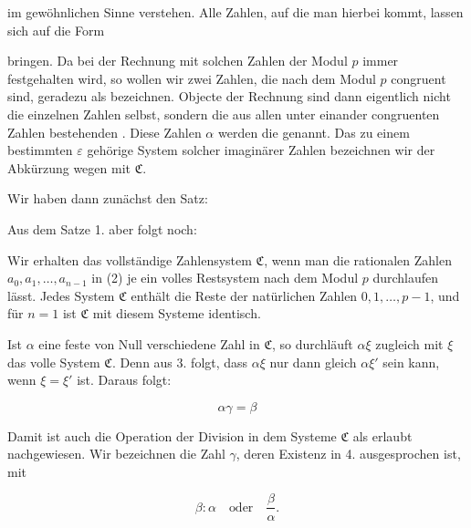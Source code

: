 im gewöhnlichen Sinne verstehen. Alle Zahlen, auf die man hierbei kommt, lassen sich auf die Form


bringen. Da bei der Rechnung mit solchen Zahlen der Modul $p$ immer festgehalten wird, so wollen wir zwei Zahlen, die nach dem Modul $p$ congruent sind, geradezu als  bezeichnen. Objecte der Rechnung sind dann eigentlich nicht die einzelnen Zahlen selbst, sondern die aus allen unter einander congruenten Zahlen bestehenden . Diese Zahlen $\alpha$ werden die  genannt. Das zu einem bestimmten $\varepsilon$ gehörige System solcher imaginärer Zahlen bezeichnen wir der Abkürzung wegen mit $\mathfrak{C}$.

Wir haben dann zunächst den Satz:


Aus dem Satze 1. aber folgt noch:


Wir erhalten das vollständige Zahlensystem $\mathfrak{C}$, wenn man die rationalen Zahlen $a_0, a_1, \ldots, a_{n-1}$ in (2) je ein volles Restsystem nach dem Modul $p$ durchlaufen lässt. Jedes System $\mathfrak{C}$ enthält die Reste der natürlichen Zahlen $0, 1, \ldots, p-1$, und für $n = 1$ ist $\mathfrak{C}$ mit diesem Systeme identisch.

Ist $\alpha$ eine feste von Null verschiedene Zahl in $\mathfrak{C}$, so durchläuft $\alpha\xi$ zugleich mit $\xi$ das volle System $\mathfrak{C}$. Denn aus 3. folgt, dass $\alpha\xi$ nur dann gleich $\alpha\xi'$ sein kann, wenn $\xi = \xi'$ ist. Daraus folgt:


\[
\alpha\gamma = \beta
\]


Damit ist auch die Operation der Division in dem Systeme $\mathfrak{C}$ als erlaubt nachgewiesen. Wir bezeichnen die Zahl $\gamma$, deren Existenz in 4. ausgesprochen ist, mit

\[
\beta : \alpha \quad \text{oder} \quad \frac{\beta}{\alpha}.
\]
